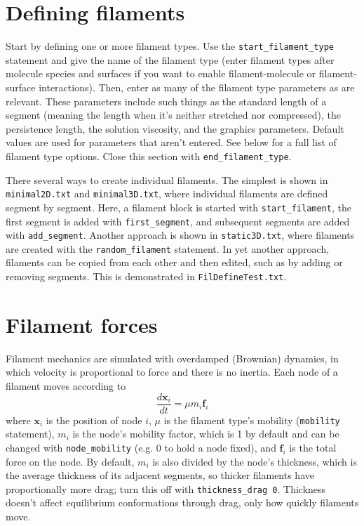 \documentclass {scrbook}
\newcommand {\ttt} {\texttt}
\begin{document}
\section{Defining filaments}

Start by defining one or more filament types. Use the \ttt{start\_filament\_type} statement and give the name of the filament type (enter filament types after molecule species and surfaces if you want to enable filament-molecule or filament-surface interactions). Then, enter as many of the filament type parameters as are relevant. These parameters include such things as the standard length of a segment (meaning the length when it's neither stretched nor compressed), the persistence length, the solution viscosity, and the graphics parameters. Default values are used for parameters that aren't entered. See below for a full list of filament type options. Close this section with \ttt{end\_filament\_type}.

There several ways to create individual filaments. The simplest is shown in \ttt{minimal2D.txt} and \ttt{minimal3D.txt}, where individual filaments are defined segment by segment. Here, a filament block is started with \ttt{start\_filament}, the first segment is added with \ttt{first\_segment}, and subsequent segments are added with \ttt{add\_segment}. Another approach is shown in \ttt{static3D.txt}, where filaments are created with the \ttt{random\_filament} statement. In yet another approach, filaments can be copied from each other and then edited, such as by adding or removing segments. This is demonstrated in \ttt{FilDefineTest.txt}.

\section{Filament forces}
\label{sec:FilForces}

Filament mechanics are simulated with overdamped (Brownian) dynamics, in which velocity is proportional to force and there is no inertia. Each node of a filament moves according to
$$\frac{d\bm{x}_i}{dt} = \mu m_i \bm{f}_i$$
where $\bm{x}_i$ is the position of node $i$, $\mu$ is the filament type's mobility (\ttt{mobility} statement), $m_i$ is the node's mobility factor, which is 1 by default and can be changed with \ttt{node\_mobility} (e.g. 0 to hold a node fixed), and $\bm{f}_i$ is the total force on the node. By default, $m_i$ is also divided by the node's thickness, which is the average thickness of its adjacent segments, so thicker filaments have proportionally more drag; turn this off with \ttt{thickness\_drag 0}. Thickness doesn't affect equilibrium conformations through drag, only how quickly filaments move.
\end{document}
